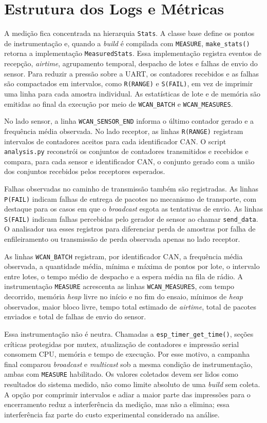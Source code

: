 \section{Estrutura dos Logs e Métricas}

A medição fica concentrada na hierarquia \texttt{Stats}. A classe base define os
pontos de instrumentação e, quando a \emph{build} é compilada com
\texttt{MEASURE}, \texttt{make\_stats()} retorna a implementação
\texttt{MeasuredStats}. Essa implementação registra eventos de recepção,
\emph{airtime}, agrupamento temporal, despacho de lotes e falhas de envio do
sensor. Para reduzir a pressão sobre a UART, os contadores recebidos e as falhas
são compactados em intervalos, como \texttt{R(RANGE)} e \texttt{S(FAIL)}, em vez
de imprimir uma linha para cada amostra individual. As estatísticas de lote e de
memória são emitidas ao final da execução por meio de \texttt{WCAN\_BATCH} e
\texttt{WCAN\_MEASURES}.

No lado sensor, a linha \texttt{WCAN\_SENSOR\_END} informa o último contador
gerado e a frequência média observada. No lado receptor, as linhas
\texttt{R(RANGE)} registram intervalos de contadores aceitos para cada
identificador CAN. O script \texttt{analysis.py} reconstrói os conjuntos de
contadores transmitidos e recebidos e compara, para cada sensor e identificador
CAN, o conjunto gerado com a união dos conjuntos recebidos pelos receptores
esperados.

Falhas observadas no caminho de transmissão também são registradas. As linhas
\texttt{P(FAIL)} indicam falhas de entrega de pacotes no mecanismo de transporte,
com destaque para os casos em que o \emph{broadcast} esgota as tentativas de
envio. As linhas \texttt{S(FAIL)} indicam falhas percebidas pelo gerador de
sensor ao chamar \texttt{send\_data}. O analisador usa esses registros para
diferenciar perda de amostras por falha de enfileiramento ou transmissão de perda
observada apenas no lado receptor.

As linhas \texttt{WCAN\_BATCH} registram, por identificador CAN, a frequência
média observada, a quantidade média, mínima e máxima de pontos por lote, o
intervalo entre lotes, o tempo médio de despacho e a espera média na fila de
rádio. A instrumentação \texttt{MEASURE} acrescenta as linhas
\texttt{WCAN\_MEASURES}, com tempo decorrido, memória \emph{heap} livre no início
e no fim do ensaio, mínimos de \emph{heap} observados, maior bloco livre, tempo
total estimado de \emph{airtime}, total de pacotes enviados e total de falhas de
envio do sensor.

Essa instrumentação não é neutra. Chamadas a \texttt{esp\_timer\_get\_time()},
seções críticas protegidas por mutex, atualização de contadores e impressão
serial consomem CPU, memória e tempo de execução. Por esse motivo, a campanha
final comparou \emph{broadcast} e \emph{multicast} sob a mesma condição de
instrumentação, ambas com \texttt{MEASURE} habilitado. Os valores coletados devem
ser lidos como resultados do sistema medido, não como limite absoluto de uma
\emph{build} sem coleta. A opção por comprimir intervalos e adiar a maior parte
das impressões para o encerramento reduz a interferência da medição, mas não a
elimina; essa interferência faz parte do custo experimental considerado na
análise.
